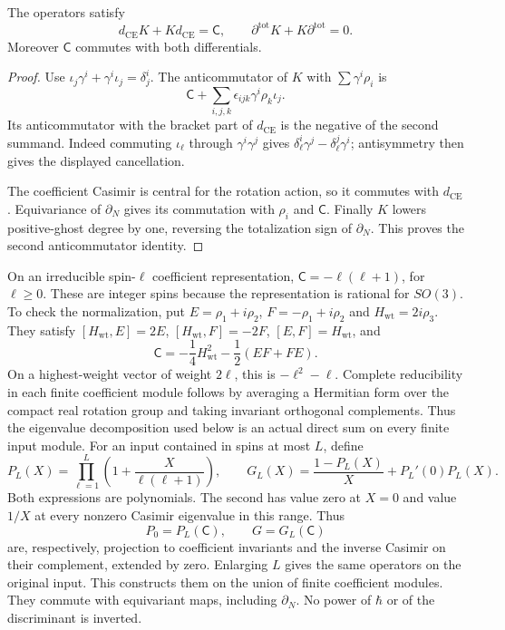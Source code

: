 \begin{lemma}\label{lem:vol2-absolute-casimir}
The operators satisfy
\[
 d_{\mathrm{CE}}K+Kd_{\mathrm{CE}}=\mathsf C,
 \qquad
 \partial^{\mathrm{tot}}K+K\partial^{\mathrm{tot}}=0.
\]
Moreover $\mathsf C$ commutes with both differentials.
\end{lemma}

\begin{proof}
Use $\iota_j\gamma^i+\gamma^i\iota_j=\delta_j^i$.
The anticommutator of $K$ with $\sum\gamma^i\rho_i$ is
\[
 \mathsf C+\sum_{i,j,k}\epsilon_{ijk}
                   \gamma^i\rho_k\iota_j.
\]
Its anticommutator with the bracket part of
$d_{\mathrm{CE}}$ is the negative of the second summand.
Indeed commuting $\iota_\ell$ through
$\gamma^i\gamma^j$ gives
$\delta_\ell^i\gamma^j-\delta_\ell^j\gamma^i$;
antisymmetry then gives the displayed cancellation.

The coefficient Casimir is central for the rotation action,
so it commutes with $d_{\mathrm{CE}}$.
Equivariance of $\partial_N$ gives its commutation with
$\rho_i$ and $\mathsf C$.
Finally $K$ lowers positive-ghost degree by one, reversing
the totalization sign of $\partial_N$. This proves the
second anticommutator identity.
\end{proof}

On an irreducible spin-$\ell$ coefficient representation,
$\mathsf C=-\ell(\ell+1)$, for $\ell\geq0$.
These are integer spins because the representation is rational
for $SO(3)$.
To check the normalization, put
$E=\rho_1+i\rho_2$, $F=-\rho_1+i\rho_2$ and
$H_{\mathrm{wt}}=2i\rho_3$. They satisfy
$[H_{\mathrm{wt}},E]=2E$, $[H_{\mathrm{wt}},F]=-2F$,
$[E,F]=H_{\mathrm{wt}}$, and
\[
 \mathsf C=-\frac14H_{\mathrm{wt}}^2-\frac12(EF+FE).
\]
On a highest-weight vector of weight $2\ell$, this is
$-\ell^2-\ell$. Complete reducibility in each finite coefficient
module follows by averaging a Hermitian form over the compact
real rotation group and taking invariant orthogonal complements.
Thus the eigenvalue decomposition used below is an actual direct
sum on every finite input module.
For an input contained in spins at most $L$, define
\begin{equation}\label{eq:vol2-absolute-spectral-polynomials}
 P_L(X)=\prod_{\ell=1}^L
               \left(1+\frac{X}{\ell(\ell+1)}\right),
 \qquad
 G_L(X)=\frac{1-P_L(X)}{X}+P_L'(0)P_L(X).
\end{equation}
Both expressions are polynomials.
The second has value zero at $X=0$ and value $1/X$ at
every nonzero Casimir eigenvalue in this range.
Thus
\[
 P_0=P_L(\mathsf C),\qquad G=G_L(\mathsf C)
\]
are, respectively, projection to coefficient invariants and
the inverse Casimir on their complement, extended by zero.
Enlarging $L$ gives the same operators on the original input.
This constructs them on the union of finite coefficient modules.
They commute with equivariant maps, including $\partial_N$.
No power of $\hbar$ or of the discriminant is inverted.

